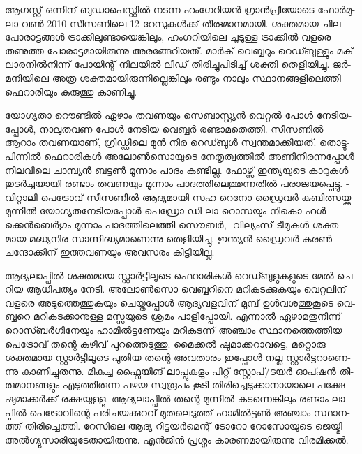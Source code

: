 \vskip 2pt

ആ­ഗ­സ്റ്റ് ഒന്നി­ന് ബു­ഡാ­പെ­സ്റ്റില്‍ നട­ന്ന ഹം­ഗേ­റി­യന്‍ ഗ്രാന്‍­പ്രീ­യോ­ടെ ഫോര്‍­മു­ലാ വണ്‍ 2010 സീ­സ­ണി­ലെ 12 റേ­സു­കള്‍­ക്ക് തീ­രു­മാ­ന­മാ­യി. ശക്ത­മായ ചില പോ­രാ­ട്ട­ങ്ങള്‍ ട്രാ­ക്കി­ലു­ണ്ടാ­യെ­ങ്കി­ലും, ഹം­ഗ­റി­യി­ലെ ചൂ­ടു­ള്ള ട്രാ­ക്കില്‍ വള­രെ തണു­ത്ത പോ­രാ­ട്ട­മാ­യി­രു­ന്നു അര­ങ്ങേ­റി­യ­ത്. മാര്‍­ക് വെ­ബ്ബ­റും റെ­ഡ്ബു­ള്ളും മക്‌­ലാ­ര­നില്‍­നി­ന്ന് പോ­യി­ന്റ് നി­ല­യില്‍ ലീ­ഡ് തി­രി­ച്ചു­പി­ടി­ച്ച് ശക്തി തെ­ളി­യി­ച്ചു. ജര്‍­മ­നി­യി­ലെ അത്ര ശക്ത­മാ­യി­രു­ന്നി­ല്ലെ­ങ്കി­ലും രണ്ടും നാ­ലും സ്ഥാ­ന­ങ്ങ­ളി­ലെ­ത്തി ഫെ­റാ­രി­യും കരു­ത്തു കാ­ണി­ച്ചു­.

­യോ­ഗ്യ­താ റൌ­ണ്ടില്‍ ഏഴാം തവ­ണ­യും ­സെ­ബാ­സ്റ്റ്യന്‍ വെ­റ്റല്‍ പോള്‍ നേ­ടി­യ­പ്പോള്‍, നാ­ലു­ത­വണ പോള്‍ നേ­ടിയ 
വെ­ബ്ബര്‍ രണ്ടാ­മ­തെ­ത്തി. സീ­സ­ണില്‍ ആറാം തവ­ണ­യാ­ണ്, ഗ്രി­ഡ്ഡി­ലെ മുന്‍ നിര ­റെ­ഡ്ബുള്‍ സ്വ­ന്ത­മാ­ക്കി­യ­ത്. 
തൊ­ട്ടു­പി­ന്നില്‍ ഫെ­റാ­രി­കള്‍ അലോണ്‍­സൊ­യു­ടെ നേ­തൃ­ത്വ­ത്തില്‍ അണി­നി­ര­ന്ന­പ്പോള്‍ നി­ല­വി­ലെ ചാ­മ്പ്യന്‍ ബട്ടണ്‍ 
മൂ­ന്നാം പാ­ദം കണ്ടി­ല്ല. ഫോ­ഴ്സ് ഇന്ത്യ­യു­ടെ കാ­റു­കള്‍ തു­ടര്‍­ച്ച­യാ­യി രണ്ടാം തവ­ണ­യും മൂ­ന്നാം പാ­ദ­ത്തി­ലെ­ത്തു­ന്ന­തില്‍ 
പരാ­ജ­യ­പ്പെ­ട്ടു. ­വി­റ്റാ­ലി പെ­ട്രോ­വ് സീ­സ­ണില്‍ ആദ്യ­മാ­യി സഹ ­റെ­നോ­ ഡ്രൈ­വര്‍ കു­ബി­ത്സ­യ്ക്കു മു­ന്നില്‍ 
യോ­ഗ്യ­ത­നേ­ടി­യ­പ്പോള്‍ പെ­ഡ്രോ ഡി ലാ റൊ­സ­യും നി­കൊ ഹള്‍­ക്കെന്‍­ബെര്‍­ഗും മൂ­ന്നാം പാ­ദ­ത്തി­ലെ­ത്തി ­സൌ­ബര്‍, ­
വി­ല്യം­സ് ടീ­മു­കള്‍ ശക്ത­മായ മദ്ധ്യ­നിര സാ­ന്നി­ദ്ധ്യ­മാ­ണെ­ന്നു തെ­ളി­യി­ച്ചു. ഇന്ത്യന്‍ ഡ്രൈ­വര്‍ കരണ്‍ ചന്ദോ­ക്കി­ന് 
ഇത്ത­വ­ണ­യും അവ­സ­രം കി­ട്ടി­യി­ല്ല.

ആ­ദ്യ­ലാ­പ്പില്‍ ശക്ത­മായ സ്റ്റാര്‍­ട്ടി­ലൂ­ടെ ഫെ­റാ­രി­കള്‍ റെ­ഡ്ബു­ളു­ക­ളു­ടെ മേല്‍ ചെ­റിയ ആധി­പ­ത്യം നേ­ടി. അലോണ്‍­സൊ 
വെ­ബ്ബ­റി­നെ മറി­ക­ട­ക്കു­ക­യും വെ­റ്റ­ലി­ന് വള­രെ അടു­ത്തെ­ത്തു­ക­യും ചെ­യ്ത­പ്പോള്‍ ആദ്യ­വ­ള­വി­ന് മു­മ്പ് ഉള്‍­വ­ശ­ത്തു­കൂ­ടെ 
വെ­ബ്ബ­റെ മറി­ക­ട­ക്കാ­നു­ള്ള മസ്സ­യു­ടെ ശ്ര­മം പാ­ളി­പ്പോ­യി. എന്നാല്‍ ഏഴാ­മ­തു­നി­ന്ന് റൊ­സ്ബര്‍­ഗി­നേ­യും ഹാ­മില്‍­ട്ട­ണേ­യും
മറി­ക­ട­ന്ന് അഞ്ചാം സ്ഥാ­ന­ത്തെ­ത്തിയ പെ­ട്രോ­വ് തന്റെ കഴി­വ് പു­റ­ത്തെ­ടു­ത്തു. മൈ­ക്കല്‍ ഷു­മാ­ക്ക­റാ­വ­ട്ടെ, മറ്റൊ­രു 
ശക്ത­മായ സ്റ്റാര്‍­ട്ടി­ലൂ­ടെ പു­തിയ തന്റെ അവ­താ­രം ഇപ്പോള്‍ നല്ല സ്റ്റാര്‍­ട്ട­റാ­ണെ­ന്നു കാ­ണി­ച്ചു­ത­ന്നു. മി­ക­ച്ച ഫ്ലൈ­യി­ങ് 
ലാ­പ്പു­ക­ളും പി­റ്റ് സ്റ്റോ­പ്/­ട­യര്‍ ഓപ്ഷന്‍ തീ­രു­മാ­ന­ങ്ങ­ളും എടു­ത്തി­രു­ന്ന പഴയ സ്വ­രൂ­പം കൂ­ടി തി­രി­ച്ചെ­ടു­ക്കാ­നാ­യാ­ലെ പക്ഷേ 
ഷു­മാ­ക്കര്‍­ക്ക് രക്ഷ­യു­ള്ളൂ. ആദ്യ­ലാ­പ്പില്‍ തന്റെ മു­ന്നില്‍ കട­ന്നെ­ങ്കി­ലും രണ്ടാം ലാ­പ്പില്‍ പെ­ട്രോ­വി­ന്റെ പരി­ച­യ­ക്കു­റ­വ് 
മു­ത­ലെ­ടു­ത്ത് ഹാ­മില്‍­ട്ടണ്‍ അഞ്ചാം സ്ഥാ­ന­ത്ത് തി­രി­ച്ചെ­ത്തി. റേ­സി­ലെ ആദ്യ റി­ട്ട­യര്‍­മെ­ന്റ് ടോ­റോ റോ­സോ­യു­ടെ 
ജെ­യ്മി അല്‍­ഗ്യു­സാ­രി­യു­ടേ­താ­യി­രു­ന്നു. എന്‍­ജിന്‍ പ്ര­ശ്നം കാ­ര­ണ­മാ­യി­രു­ന്നു വി­ര­മി­ക്കല്‍.


